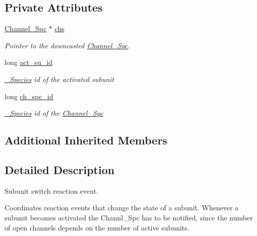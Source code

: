 \subsection*{Private Attributes}
\begin{DoxyCompactItemize}
\item 
\hyperlink{classnw_1_1_channel___spc}{Channel\+\_\+\+Spc} $\ast$ \hyperlink{classnw_1_1_sub_unit_switch___rct___evt_a260fabe9e3e1d8b79c3c80bb987716a5}{chs}
\begin{DoxyCompactList}\small\item\em Pointer to the downcasted \hyperlink{classnw_1_1_channel___spc}{Channel\+\_\+\+Spc}. \end{DoxyCompactList}\item 
long \hyperlink{classnw_1_1_sub_unit_switch___rct___evt_a3f14cca01fc1645696666330a7354865}{act\+\_\+su\+\_\+id}
\begin{DoxyCompactList}\small\item\em \hyperlink{classnw_1_1___species}{\+\_\+\+Species} id of the activated subunit \end{DoxyCompactList}\item 
long \hyperlink{classnw_1_1_sub_unit_switch___rct___evt_a7d1c65995bc49d7e6e625aa090325af1}{ch\+\_\+spc\+\_\+id}
\begin{DoxyCompactList}\small\item\em \hyperlink{classnw_1_1___species}{\+\_\+\+Species} id of the \hyperlink{classnw_1_1_channel___spc}{Channel\+\_\+\+Spc} \end{DoxyCompactList}\end{DoxyCompactItemize}
\subsection*{Additional Inherited Members}


\subsection{Detailed Description}
Subunit switch reaction event. 

Coordinates reaction events that change the state of a subunit. Whenever a subunit becomes activated the Channl\+\_\+\+Spc has to be notified, since the number of open channels depends on the number of active subunits. 

